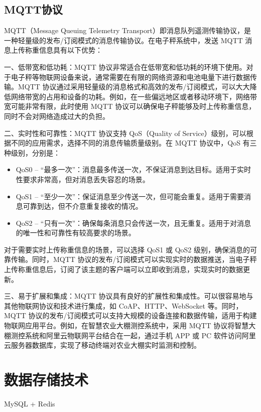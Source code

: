 \documentclass{xduugthesis}
\begin{document}
\subsection{MQTT协议}

MQTT（Message Queuing Telemetry Transport）即消息队列遥测传输协议，是一种轻量级的发布/订阅模式的消息传输协议。在电子秤系统中，发送 MQTT 消息上传称重信息具有以下优势：

一、低带宽和低功耗：MQTT 协议非常适合在低带宽和低功耗的环境下使用。对于电子秤等物联网设备来说，通常需要在有限的网络资源和电池电量下进行数据传输。MQTT 协议通过采用轻量级的消息格式和高效的发布/订阅模式，可以大大降低网络带宽的占用和设备的功耗。例如，在一些偏远地区或者移动环境下，网络带宽可能非常有限，此时使用 MQTT 协议可以确保电子秤能够及时上传称重信息，同时不会对网络造成过大的负担\cite{Jia2015}。

二、实时性和可靠性：MQTT 协议支持 QoS（Quality of Service）级别，可以根据不同的应用需求，选择不同的消息传输质量级别。在 MQTT 协议中，QoS 有三种级别\cite{Jia2015}，分别是：
\begin{itemize}
    \item QoS0 – “最多一次”：消息最多传送一次，不保证消息到达目标。适用于实时性要求非常高，但对消息丢失容忍的场景。
    \item QoS1 – “至少一次”：保证消息至少传送一次，但可能会重复。适用于需要消息可靠到达，但不介意重复接收的情况。
    \item QoS2 – “只有一次”：确保每条消息只会传送一次，且无重复。适用于对消息的唯一性和可靠性有较高要求的场景。
\end{itemize}

对于需要实时上传称重信息的场景，可以选择 QoS1 或 QoS2 级别，确保消息的可靠传输。同时，MQTT 协议的发布/订阅模式可以实现实时的数据推送，当电子秤上传称重信息后，订阅了该主题的客户端可以立即收到消息，实现实时的数据更新。

三、易于扩展和集成：MQTT 协议具有良好的扩展性和集成性。可以很容易地与其他物联网协议和技术进行集成，如 CoAP、HTTP、WebSocket 等。同时，MQTT 协议的发布/订阅模式可以支持大规模的设备连接和数据传输，适用于构建物联网应用平台。例如，在智慧农业大棚测控系统中，采用 MQTT 协议将智慧大棚测控系统和阿里云物联网平台结合在一起，通过手机 APP 或 PC 软件访问阿里云服务器数据库，实现了移动终端对农业大棚实时监测和控制\cite{Liang2020}。

\section{数据存储技术}

MySQL + Redis
\end{document}
